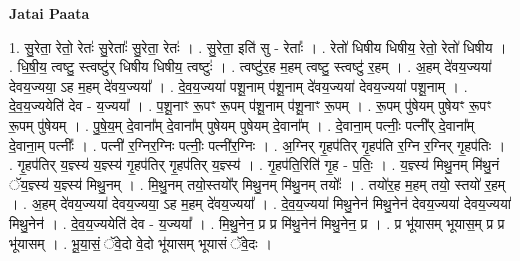 \documentclass[17pt]{extarticle}
\begin{document}
\textbf{Jatai Paata} \newline

1. सु॒रेता॒ रेतो॒ रेतः॑ सु॒रेताः᳚ सु॒रेता॒ रेतः॑ । . सु॒रेता॒ इति॑ सु - रेताः᳚ । . रेतो॑ धिषीय धिषीय॒ रेतो॒ रेतो॑ धिषीय । . धि॒षी॒य॒ त्वष्टु॒ स्त्वष्टु॑र् धिषीय धिषीय॒ त्वष्टुः॑ । . त्वष्टु॑र॒ह म॒हम् त्वष्टु॒ स्त्वष्टु॑ र॒हम् । . अ॒हम् दे॑वय॒ज्यया॑ देवय॒ज्यया॒ ऽह म॒हम् दे॑वय॒ज्यया᳚ । . दे॒व॒य॒ज्यया॑ पशू॒नाम् प॑शू॒नाम् दे॑वय॒ज्यया॑ देवय॒ज्यया॑ पशू॒नाम् । . दे॒व॒य॒ज्ययेति॑ देव - य॒ज्यया᳚ । . प॒शू॒नाꣳ रू॒पꣳ रू॒पम् प॑शू॒नाम् प॑शू॒नाꣳ रू॒पम् । . रू॒पम् पु॑षेयम् पुषेयꣳ रू॒पꣳ रू॒पम् पु॑षेयम् । . पु॒षे॒य॒म् दे॒वाना᳚म् दे॒वाना᳚म् पुषेयम् पुषेयम् दे॒वाना᳚म् । . दे॒वाना॒म् पत्नीः॒ पत्नी᳚र् दे॒वाना᳚म् दे॒वाना॒म् पत्नीः᳚ । . पत्नी॑ र॒ग्निर॒ग्निः पत्नीः॒ पत्नी॑र॒ग्निः । . अ॒ग्निर् गृ॒हप॑तिर् गृ॒हप॑ति र॒ग्नि र॒ग्निर् गृ॒हप॑तिः । . गृ॒हप॑तिर् य॒ज्ञ्स्य॑ य॒ज्ञ्स्य॑ गृ॒हप॑तिर् गृ॒हप॑तिर् य॒ज्ञ्स्य॑ । . गृ॒हप॑ति॒रिति॑ गृ॒ह - प॒तिः॒ । . य॒ज्ञ्स्य॑ मिथु॒नम् मि॑थु॒नं ॅय॒ज्ञ्स्य॑ य॒ज्ञ्स्य॑ मिथु॒नम् । . मि॒थु॒नम् तयो॒स्तयो᳚र् मिथु॒नम् मि॑थु॒नम् तयोः᳚ । . तयो॑र॒ह म॒हम् तयो॒ स्तयो॑ र॒हम् । . अ॒हम् दे॑वय॒ज्यया॑ देवय॒ज्यया॒ ऽह म॒हम् दे॑वय॒ज्यया᳚ । . दे॒व॒य॒ज्यया॑ मिथु॒नेन॑ मिथु॒नेन॑ देवय॒ज्यया॑ देवय॒ज्यया॑ मिथु॒नेन॑ । . दे॒व॒य॒ज्ययेति॑ देव - य॒ज्यया᳚ । . मि॒थु॒नेन॒ प्र प्र मि॑थु॒नेन॑ मिथु॒नेन॒ प्र । . प्र भू॑यासम् भूयास॒म् प्र प्र भू॑यासम् । . भू॒या॒सं॒ ॅवे॒दो वे॒दो भू॑यासम् भूयासं ॅवे॒दः । \newline
\end{document}

